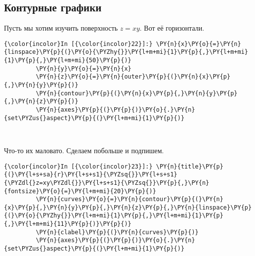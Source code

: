 \subsection{Контурные графики}
\label{matplotlib6}

Пусть мы хотим изучить поверхность \(z=xy\). Вот её горизонтали.

    \begin{Verbatim}[commandchars=\\\{\}]
{\color{incolor}In [{\color{incolor}22}]:} \PY{n}{x}\PY{o}{=}\PY{n}{linspace}\PY{p}{(}\PY{o}{\PYZhy{}}\PY{l+m+mi}{1}\PY{p}{,}\PY{l+m+mi}{1}\PY{p}{,}\PY{l+m+mi}{50}\PY{p}{)}
         \PY{n}{y}\PY{o}{=}\PY{n}{x}
         \PY{n}{z}\PY{o}{=}\PY{n}{outer}\PY{p}{(}\PY{n}{x}\PY{p}{,}\PY{n}{y}\PY{p}{)}
         \PY{n}{contour}\PY{p}{(}\PY{n}{x}\PY{p}{,}\PY{n}{y}\PY{p}{,}\PY{n}{z}\PY{p}{)}
         \PY{n}{axes}\PY{p}{(}\PY{p}{)}\PY{o}{.}\PY{n}{set\PYZus{}aspect}\PY{p}{(}\PY{l+m+mi}{1}\PY{p}{)}
\end{Verbatim}

    \begin{center}
    \end{center}
    { \hspace*{\fill} \\}
    
    Что-то их маловато. Сделаем побольше и подпишем.

    \begin{Verbatim}[commandchars=\\\{\}]
{\color{incolor}In [{\color{incolor}23}]:} \PY{n}{title}\PY{p}{(}\PY{l+s+sa}{r}\PY{l+s+s1}{\PYZsq{}}\PY{l+s+s1}{\PYZdl{}z=xy\PYZdl{}}\PY{l+s+s1}{\PYZsq{}}\PY{p}{,}\PY{n}{fontsize}\PY{o}{=}\PY{l+m+mi}{20}\PY{p}{)}
         \PY{n}{curves}\PY{o}{=}\PY{n}{contour}\PY{p}{(}\PY{n}{x}\PY{p}{,}\PY{n}{y}\PY{p}{,}\PY{n}{z}\PY{p}{,}\PY{n}{linspace}\PY{p}{(}\PY{o}{\PYZhy{}}\PY{l+m+mi}{1}\PY{p}{,}\PY{l+m+mi}{1}\PY{p}{,}\PY{l+m+mi}{11}\PY{p}{)}\PY{p}{)}
         \PY{n}{clabel}\PY{p}{(}\PY{n}{curves}\PY{p}{)}
         \PY{n}{axes}\PY{p}{(}\PY{p}{)}\PY{o}{.}\PY{n}{set\PYZus{}aspect}\PY{p}{(}\PY{l+m+mi}{1}\PY{p}{)}
\end{Verbatim}

    \begin{center}
    \end{center}
    { \hspace*{\fill} \\}
    
